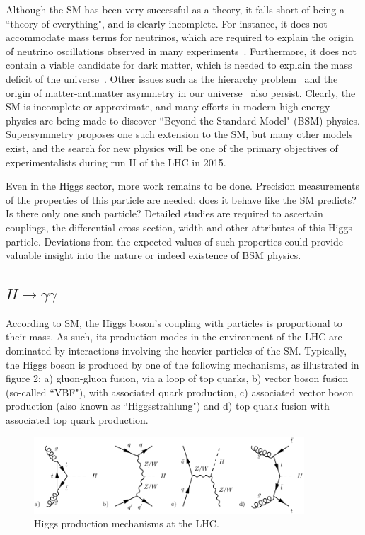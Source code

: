 \documentclass[10pt]{article}
\begin{document}
Although the SM has been very successful as a theory, it falls short of being a “theory of everything", and is clearly incomplete. For instance, it does not accommodate mass terms for neutrinos, which are required to explain the origin of neutrino oscillations observed in many experiments~\cite{SuperK,SNO,DayaBay}. Furthermore, it does not contain a viable candidate for dark matter, which is needed to explain the mass deficit of the universe~\cite{DM}. Other issues such as the hierarchy problem~\cite{Hierarchy} and the origin of matter-antimatter asymmetry in our universe~\cite{Asymmetry} also persist. Clearly, the SM is incomplete or approximate, and many efforts in modern high energy physics are being made to discover “Beyond the Standard Model" (BSM) physics. Supersymmetry proposes one such extension to the SM, but many other models exist, and the search for new physics will be one of the primary objectives of experimentalists during run II of the LHC in 2015.

Even in the Higgs sector, more work remains to be done. Precision measurements of the properties of this particle are needed: does it behave like the SM predicts? Is there only one such particle? Detailed studies are required to ascertain couplings, the differential cross section, width and other attributes of this Higgs particle. Deviations from the expected values of such properties could provide valuable insight into the nature or indeed existence of BSM physics.

\subsection{$H \rightarrow \gamma \gamma$}
According to SM, the Higgs boson's coupling with particles is proportional to their mass. As such, its production modes in the environment of the LHC are dominated by interactions involving the heavier particles of the SM. Typically, the Higgs boson is produced by one of the following mechanisms, as illustrated in figure 2: a) gluon-gluon fusion, via a loop of top quarks, b) vector boson fusion (so-called “VBF"), with associated quark production, c) associated vector boson production (also known as “Higgsstrahlung") and d) top quark fusion with associated top quark production.
\begin{figure}[h!]


  \includegraphics[width=0.9\textwidth]{"test"}
  \caption{Higgs production mechanisms at the LHC.}
\end{figure}
\end{document}
